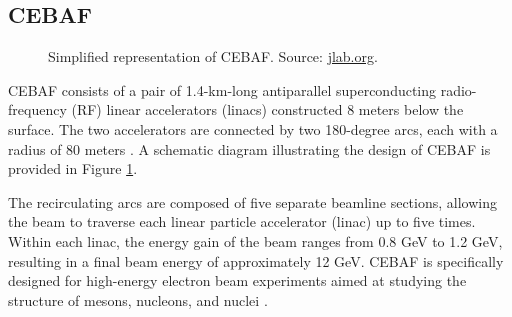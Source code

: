 \subsection{CEBAF}
\label{11.100::cebaf}
    \begin{figure}[b!]
        \centering{}
        \caption[CEBAF.]{Simplified representation of CEBAF.
        Source: \hyperlink{jlab.org/}{jlab.org}.}
        \label{fig::11.100::cebaf}
    \end{figure}

    CEBAF consists of a pair of 1.4-km-long antiparallel superconducting radio-frequency (RF) linear accelerators (linacs) constructed 8 meters below the surface.
    The two accelerators are connected by two 180-degree arcs, each with a radius of 80 meters \cite{leemann2001}.
    A schematic diagram illustrating the design of CEBAF is provided in Figure \ref{fig::11.100::cebaf}.

    The recirculating arcs are composed of five separate beamline sections, allowing the beam to traverse each linear particle accelerator (linac) up to five times.
    Within each linac, the energy gain of the beam ranges from 0.8 GeV to 1.2 GeV, resulting in a final beam energy of approximately 12 GeV.
    CEBAF is specifically designed for high-energy electron beam experiments aimed at studying the structure of mesons, nucleons, and nuclei \cite{rode2010}.
